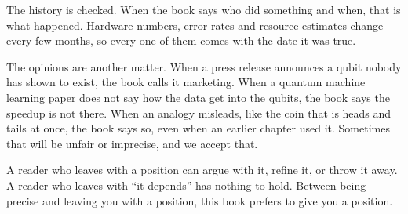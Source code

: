 The history is checked. When the book says who did something and when, that is
what happened. Hardware numbers, error rates and resource estimates change every
few months, so every one of them comes with the date it was true.

The opinions are another matter. When a press release announces a qubit nobody has
shown to exist, the book calls it marketing. When a quantum machine learning paper does
not say how the data get into the qubits, the book says the speedup is not there. When
an analogy misleads, like the coin that is heads and tails at once, the book says so,
even when an earlier chapter used it. Sometimes that will be unfair or imprecise, and
we accept that.

A reader who leaves with a position can argue with it, refine it, or throw it
away. A reader who leaves with ``it depends'' has nothing to hold. Between being
precise and leaving you with a position, this book prefers to give you a
position.
